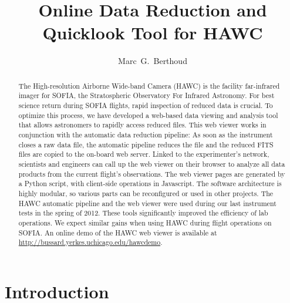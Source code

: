 
\resetcounters




\title{Online Data Reduction and Quicklook Tool for HAWC}
\author{Marc~G.~Berthoud
}


\begin{abstract}
The High-resolution Airborne Wide-band Camera (HAWC) is the facility far-infrared imager for SOFIA, the Stratospheric Observatory For Infrared Astronomy.  For best science return during SOFIA flights, rapid inspection of reduced data is crucial. To optimize this process, we have developed a web-based data viewing and analysis tool that allows astronomers to rapidly access reduced files.  This web viewer works in conjunction with the automatic data reduction pipeline: As soon as the instrument closes a raw data file, the automatic pipeline reduces the file and the reduced FITS files are copied to the on-board web server. Linked to the experimenter's network, scientists and engineers can call up the web viewer on their browser to analyze all data products from the current flight's observations.  The web viewer pages are generated by a Python script, with client-side operations in Javascript. The software architecture is highly modular, so various parts can be reconfigured or used in other projects.  The HAWC automatic pipeline and the web viewer were used during our last instrument tests in the spring of 2012. These tools significantly improved the efficiency of lab operations. We expect similar gains when using HAWC during flight operations on SOFIA. An online demo of the HAWC web viewer is available at \url{http://bussard.yerkes.uchicago.edu/hawcdemo}.\end{abstract}

\section{Introduction}

